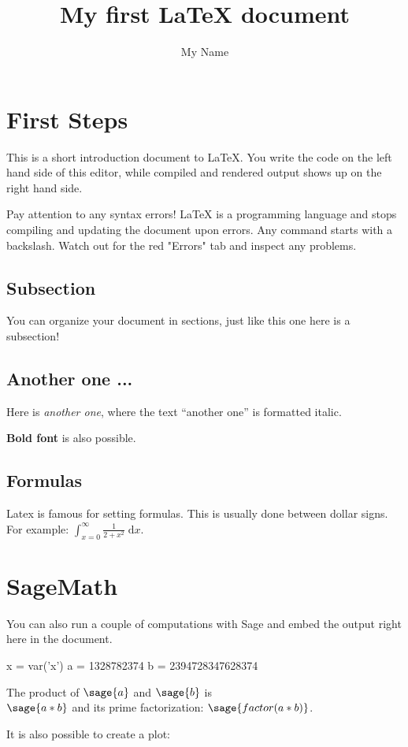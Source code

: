 \documentclass{article}
\title{My first \LaTeX{} document}
\author{My Name}
\begin{document}
\section{First Steps}

This is a short introduction document to \LaTeX{}.
You write the code on the left hand side of this editor,
while compiled and rendered output shows up on the right hand side.

Pay attention to any syntax errors!
\LaTeX{} is a programming language and stops compiling and updating the document upon errors.
Any command starts with a backslash.
Watch out for the red "Errors" tab and inspect any problems.

\subsection{Subsection}

You can organize your document in sections,
just like this one here is a subsection!

\subsection{Another one ...}

Here is \textit{another one},
where the text ``another one'' is formatted italic.

\textbf{Bold font} is also possible.

\subsection{Formulas}

Latex is famous for setting formulas.
This is usually done between dollar signs.
For example: $\int_{x=0}^{\infty} \frac{1}{2 + x^2}\;\mathrm{d}x$.

\section{SageMath}

You can also run a couple of computations with Sage and embed the output right here in the document.

\begin{sagesilent}
x = var('x')
a = 1328782374
b = 2394728347628374
\end{sagesilent}

The product of $\sage{a}$ and $\sage{b}$  is \\
$\sage{a*b}$
and its prime factorization: $\sage{factor(a*b)}$.

It is also possible to create a plot:

\begin{center}
\end{center}
\end{document}
